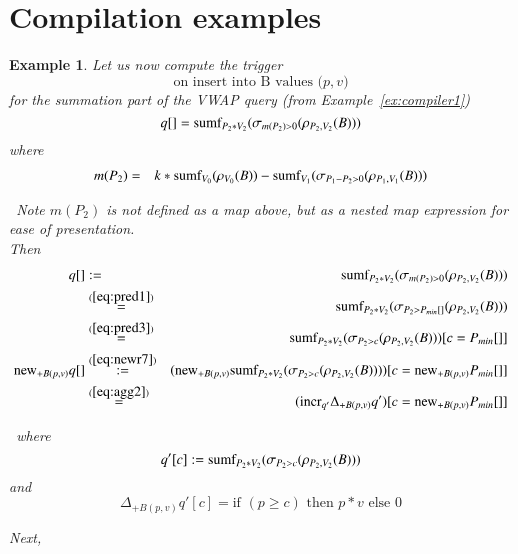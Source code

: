 \documentclass{article}
\newtheorem{example}[theorem]{Example}
\begin{document}
\pagebreak
\section{Compilation examples}
\begin{example}\em
Let us now compute the trigger
\[
\mbox{on insert into B values ($p, v$)}
\]
for the summation part of the VWAP query (from Example~\ref{ex:compiler1})
\[
q[] = \mbox{sumf}_{P_2 * V_2}(\sigma_{m(P_2) > 0} (\rho_{P_2, V_2}(B)))
\]
where
\begin{eqnarray*}
m(P_2) &=&
k*\mbox{sumf}_{V_0}(\rho_{V_0}(B)) -
\mbox{sumf}_{V_1}(\sigma_{P_1 - P_2 > 0}(\rho_{P_1,V_1}(B)))
\\
\end{eqnarray*}

\noindent~Note $m(P_2)$ is not defined as a map above, but as a nested map
expression for ease of presentation.\\

Then
\begin{eqnarray*}
q[] &:=&
\mbox{sumf}_{P_2 * V_2}(\sigma_{m(P_2) > 0} (\rho_{P_2, V_2}(B)))
\\
&\stackrel{(\ref{eq:pred1})}{=}&
\mbox{sumf}_{P_2 * V_2}(\sigma_{P_2 > P_{min}[]} (\rho_{P_2, V_2}(B)))
\\
&\stackrel{(\ref{eq:pred3})}{=}&
\mbox{sumf}_{P_2 * V_2}(\sigma_{P_2 > c} (\rho_{P_2, V_2}(B)))[c=P_{min}[]]
\\
\mathrm{new}_{+B(p,v)} q[]
&\stackrel{(\ref{eq:newr7})}{:=}&
(\mathrm{new}_{+B(p,v)}
\mbox{sumf}_{P_2 * V_2}(\sigma_{P_2 > c} (\rho_{P_2, V_2}(B))))
[c=\mathrm{new}_{+B(p,v)} P_{min}[]]
\\
&\stackrel{(\ref{eq:agg2})}{=}&
(\mathrm{incr}_{q'} \Delta_{+B(p,v)} q')
[c=\mathrm{new}_{+B(p,v)} P_{min}[]]
\end{eqnarray*}

\noindent~where
\[q'[c]:=\mbox{sumf}_{P_2 * V_2}(\sigma_{P_2 > c} (\rho_{P_2, V_2}(B)))\]
and
\[
\Delta_{+B(p,v)} q'[c] =
   \mbox{if $(p \ge c)$ then $p * v$ else $0$}
\]

Next,


\end{example}
\end{document}
